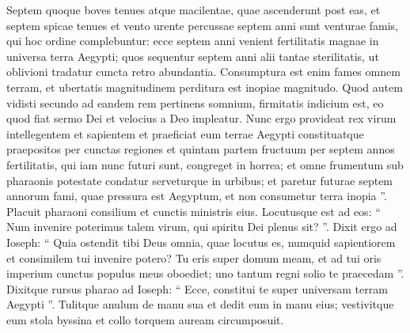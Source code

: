 \begin{biblechapter}
\begin{biblechapter}
\begin{biblechapter}
\begin{biblechapter}
\begin{biblechapter}
\begin{biblechapter}
\begin{biblechapter}
\begin{biblechapter}
\begin{biblechapter}
\begin{biblechapter}
\begin{biblechapter}
\begin{biblechapter}
\begin{biblechapter}
\begin{biblechapter}
\begin{biblechapter}
\begin{biblechapter}
\begin{biblechapter}
\begin{biblechapter}
\begin{biblechapter}
\begin{biblechapter}
\begin{biblechapter}
\begin{biblechapter}
\begin{biblechapter}
\begin{biblechapter}
\begin{biblechapter}
\begin{biblechapter}
\begin{biblechapter}
\begin{biblechapter}
\begin{biblechapter}
\begin{biblechapter}
\begin{biblechapter}
\begin{biblechapter}
\begin{biblechapter}
\begin{biblechapter}
\begin{biblechapter}
\begin{biblechapter}
\begin{biblechapter}
\begin{biblechapter}
\begin{biblechapter}
\begin{biblechapter}
\begin{biblechapter}
\verse Septem quoque boves tenues atque macilentae, quae ascenderunt post eas, et septem spicae tenues et vento urente percussae septem anni sunt venturae famis, 
\verse qui hoc ordine complebuntur: 
\verse ecce septem anni venient fertilitatis magnae in universa terra Aegypti; 
\verse quos sequentur septem anni alii tantae sterilitatis, ut oblivioni tradatur cuncta retro abundantia. Consumptura est enim fames omnem terram, 
\verse et ubertatis magnitudinem perditura est inopiae magnitudo. 
\verse Quod autem vidisti secundo ad eandem rem pertinens somnium, firmitatis indicium est, eo quod fiat sermo Dei et velocius a Deo impleatur.
 \verse Nunc ergo provideat rex virum intellegentem et sapientem et praeficiat eum terrae Aegypti 
\verse constituatque praepositos per cunctas regiones et quintam partem fructuum per septem annos fertilitatis, 
\verse qui iam nunc futuri sunt, congreget in horrea; et omne frumentum sub pharaonis potestate condatur serveturque in urbibus; 
\verse et paretur futurae septem annorum fami, quae pressura est Aegyptum, et non consumetur terra inopia ”.
 \verse Placuit pharaoni consilium et cunctis ministris eius. 
\verse Locutusque est ad eos: “ Num invenire poterimus talem virum, qui spiritu Dei plenus sit? ”. 
 \verse Dixit ergo ad Ioseph: “ Quia ostendit tibi Deus omnia, quae locutus es, numquid sapientiorem et consimilem tui invenire potero? 
\verse Tu eris super domum meam, et ad tui oris imperium cunctus populus meus oboediet; uno tantum regni solio te praecedam ”. 
\verse Dixitque rursus pharao ad Ioseph: “ Ecce, constitui te super universam terram Aegypti ”.
 \verse Tulitque anulum de manu sua et dedit eum in manu eius; vestivitque eum stola byssina et collo torquem auream circumposuit. 

\end{biblechapter}
\end{biblechapter}
\end{biblechapter}
\end{biblechapter}
\end{biblechapter}
\end{biblechapter}
\end{biblechapter}
\end{biblechapter}
\end{biblechapter}
\end{biblechapter}
\end{biblechapter}
\end{biblechapter}
\end{biblechapter}
\end{biblechapter}
\end{biblechapter}
\end{biblechapter}
\end{biblechapter}
\end{biblechapter}
\end{biblechapter}
\end{biblechapter}
\end{biblechapter}
\end{biblechapter}
\end{biblechapter}
\end{biblechapter}
\end{biblechapter}
\end{biblechapter}
\end{biblechapter}
\end{biblechapter}
\end{biblechapter}
\end{biblechapter}
\end{biblechapter}
\end{biblechapter}
\end{biblechapter}
\end{biblechapter}
\end{biblechapter}
\end{biblechapter}
\end{biblechapter}
\end{biblechapter}
\end{biblechapter}
\end{biblechapter}
\end{biblechapter}
